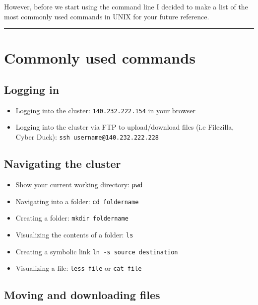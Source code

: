 \documentclass[
]{book}
\providecommand{\tightlist}{%
  \setlength{\itemsep}{0pt}\setlength{\parskip}{0pt}}
\begin{document}
However, before we start using the command line I decided to make a list of the most commonly used commands in UNIX for your future reference.

\begin{center}\rule{0.5\linewidth}{0.5pt}\end{center}

\hypertarget{commonly-used-commands}{%
\section{Commonly used commands}\label{commonly-used-commands}}

\hypertarget{logging-in}{%
\subsection{Logging in}\label{logging-in}}

\begin{itemize}
\tightlist
\item
  Logging into the cluster: \texttt{140.232.222.154} in your browser
\item
  Logging into the cluster via FTP to upload/download files (i.e Filezilla, Cyber Duck): \texttt{ssh\ username@140.232.222.228}
\end{itemize}

\hypertarget{navigating-the-cluster}{%
\subsection{Navigating the cluster}\label{navigating-the-cluster}}

\begin{itemize}
\tightlist
\item
  Show your current working directory: \texttt{pwd}
\item
  Navigating into a folder: \texttt{cd\ foldername}
\item
  Creating a folder: \texttt{mkdir\ foldername}
\item
  Visualizing the contents of a folder: \texttt{ls}
\item
  Creating a symbolic link \texttt{ln\ -s\ source\ destination}
\item
  Visualizing a file: \texttt{less\ file} or \texttt{cat\ file}
\end{itemize}

\hypertarget{moving-and-downloading-files}{%
\subsection{Moving and downloading files}\label{moving-and-downloading-files}}
\end{document}
